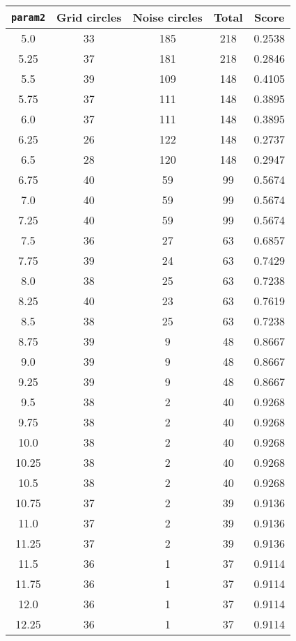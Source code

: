 \documentclass[letterpaper, 12pt]{article}
\begin{document}
\begin{longtable}{|c|c|c|c|c|}
\hline
\textbf{\texttt{param2}} & \textbf{Grid circles} & \textbf{Noise circles} & \textbf{Total} & \textbf{Score} \\
\hline
5.0 & 33 & 185 & 218 & 0.2538 \\
\hline
5.25 & 37 & 181 & 218 & 0.2846 \\
\hline
5.5 & 39 & 109 & 148 & 0.4105 \\
\hline
5.75 & 37 & 111 & 148 & 0.3895 \\
\hline
6.0 & 37 & 111 & 148 & 0.3895 \\
\hline
6.25 & 26 & 122 & 148 & 0.2737 \\
\hline
6.5 & 28 & 120 & 148 & 0.2947 \\
\hline
6.75 & 40 & 59 & 99 & 0.5674 \\
\hline
7.0 & 40 & 59 & 99 & 0.5674 \\
\hline
7.25 & 40 & 59 & 99 & 0.5674 \\
\hline
7.5 & 36 & 27 & 63 & 0.6857 \\
\hline
7.75 & 39 & 24 & 63 & 0.7429 \\
\hline
8.0 & 38 & 25 & 63 & 0.7238 \\
\hline
8.25 & 40 & 23 & 63 & 0.7619 \\
\hline
8.5 & 38 & 25 & 63 & 0.7238 \\
\hline
8.75 & 39 & 9 & 48 & 0.8667 \\
\hline
9.0 & 39 & 9 & 48 & 0.8667 \\
\hline
9.25 & 39 & 9 & 48 & 0.8667 \\
\hline
9.5 & 38 & 2 & 40 & 0.9268 \\
\hline
9.75 & 38 & 2 & 40 & 0.9268 \\
\hline
10.0 & 38 & 2 & 40 & 0.9268 \\
\hline
10.25 & 38 & 2 & 40 & 0.9268 \\
\hline
10.5 & 38 & 2 & 40 & 0.9268 \\
\hline
10.75 & 37 & 2 & 39 & 0.9136 \\
\hline
11.0 & 37 & 2 & 39 & 0.9136 \\
\hline
11.25 & 37 & 2 & 39 & 0.9136 \\
\hline
11.5 & 36 & 1 & 37 & 0.9114 \\
\hline
11.75 & 36 & 1 & 37 & 0.9114 \\
\hline
12.0 & 36 & 1 & 37 & 0.9114 \\
\hline
12.25 & 36 & 1 & 37 & 0.9114 \\
\hline

\end{longtable}
\end{document}
